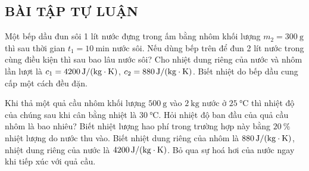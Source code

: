 	\subsection{BÀI TẬP TỰ LUẬN}
	\setcounter{ex}{0}
\begin{ex}
	Một bếp dầu đun sôi 1 lít nước đựng trong ấm bằng nhôm khối lượng $m_2=\SI{300}{\gram}$ thì sau thời gian $t_1=\SI{10}{\minute}$ nước sôi. Nếu dùng bếp trên để đun 2 lít nước trong cùng điều kiện thì sau bao lâu nước sôi? Cho nhiệt dung riêng của nước và nhôm lần lượt là $c_1=\SI{4200}{\joule/\left(\kilogram\cdot\kelvin\right)}$, $c_2=\SI{880}{\joule/\left(\kilogram\cdot\kelvin\right)}$. Biết nhiệt do bếp dầu cung cấp một cách đều đặn.
\end{ex}
\begin{ex}
	Khi thả một quả cầu nhôm khối lượng $\SI{500}{\gram}$ vào $\SI{2}{\kilogram}$ nước ở $\SI{25}{\celsius}$ thì nhiệt độ của chúng sau khi cân bằng nhiệt là $\SI{30}{\celsius}$. Hỏi nhiệt độ ban đầu của quả cầu nhôm là bao nhiêu? Biết nhiệt lượng hao phí trong trường hợp này bằng $\SI{20}{\percent}$ nhiệt lượng do nước thu vào. Biết nhiệt dung riêng của nhôm là $\SI{880}{\joule/\left(\kilogram\cdot\kelvin\right)}$, nhiệt dung riêng của nước là $\SI{4200}{\joule/\left(\kilogram\cdot\kelvin\right)}$. Bỏ qua sự hoá hơi của nước ngay khi tiếp xúc với quả cầu.
	
\end{ex}
